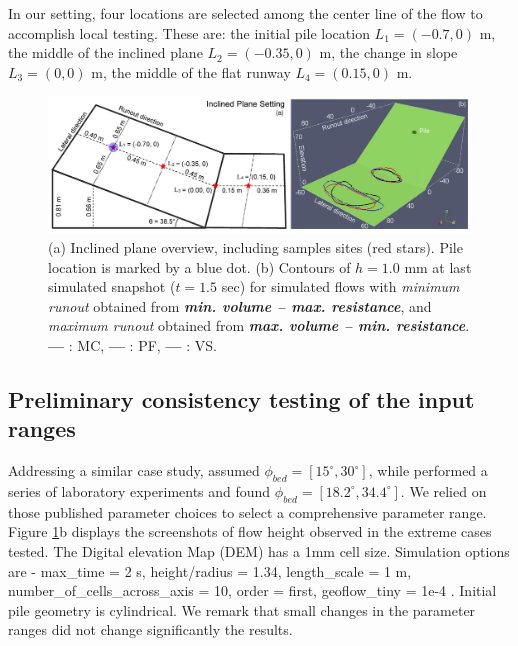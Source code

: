 \documentclass{article}
\begin{document}
In our setting, four locations are selected among the center line of the flow to accomplish local testing. These are: the initial pile location $L_1=(-0.7,0)$ m, the middle of the inclined plane $L_2=(-0.35,0)$ m, the change in slope $L_3=(0,0)$ m, the middle of the flat runway $L_4=(0.15,0)$ m.
\begin{figure}[H]
    \includegraphics[width=1\textwidth]{figures/incline/InclPlane.jpg}
    \centering
    \caption{(a) Inclined plane overview, including samples sites (red stars). Pile location is marked by a blue dot. (b) Contours of $h = 1.0$ mm at last simulated snapshot ($t = 1.5$ sec) for simulated flows with \emph{minimum runout} obtained from \emph{\textbf{min. volume -- max. resistance}}, and \emph{maximum runout} obtained from \emph{\textbf{max. volume -- min. resistance}}. {\color{red} \textbf{---}} : MC, {\color{blue} \textbf{---}} : PF, \textbf{---} : VS.} \label{fig:Ramp-first}
\end{figure}

\subsection{Preliminary consistency testing of the input ranges}\label{consistency}
Addressing a similar case study, \citep{Dalbey2008} assumed $\phi_{bed}=[15^\mathrm{\circ}, 30^\mathrm{\circ}]$, while \citep{WebbBursik2016} performed a series of laboratory experiments and found $\phi_{bed}=[18.2^\mathrm{\circ}, 34.4^\mathrm{\circ}]$. We relied on those published parameter choices to select a comprehensive parameter range. Figure \ref{fig:Ramp-first}b displays the screenshots of flow height observed in the extreme cases tested. The Digital elevation Map (DEM) has a 1mm cell size. Simulation options are - max\_time = 2 s, height/radius = 1.34, length\_scale = 1 m, number\_of\_cells\_across\_axis = 10, order = first, geoflow\_tiny = 1e-4 \citep{Patra2005,Aghakhani2016}. Initial pile geometry is cylindrical. We remark that small changes in the parameter ranges did not change significantly the results.

\end{document}
